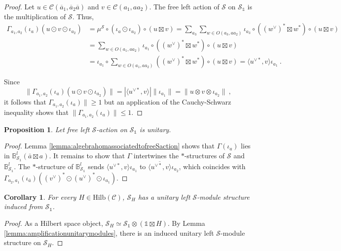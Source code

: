 \documentclass[a4paper,11pt,reqno]{amsart}
\numberwithin{equation}{section}
\newtheorem{corollary}[theorem]{Corollary}
\newtheorem{proposition}[theorem]{Proposition}
\theoremstyle{remark}
\theoremstyle{definition}
\newcommand{\bB}{\mathbb B}
\newcommand{\cC}{\mathcal C}
\newcommand{\cS}{\mathcal S}
\newcommand\un{{\mathds 1}}
\newcommand{\Hilb}{\mathrm{Hilb}}
\begin{document}
\begin{proof}
	Let $u \in \cC(\overline{a}_1, \overline{a}_2 \overline{a})$ and $v \in \cC(a_1, a a_2)$. The free left action of $\cS$ on $\cS_\un$ is the multiplication of $\cS$. Thus, 
	\begin{align*}
		\Gamma_{a_1,a_2}(\iota_a) (u \odot v \odot \iota_{a_2}) & = \mu^\cS \circ (\iota_a \odot \iota_{a_2}) \circ (u \boxtimes v) = \sum_{a_3} \sum_{w \in O(a_3,a a_2)} \iota_{a_3} \circ ( (w^\vee)^* \boxtimes w^*)  \circ (u \boxtimes v) \\
		& = \sum_{w \in O(a_1,a a_2)} \iota_{a_1} \circ ( (w^\vee)^* \boxtimes w^*)  \circ (u \boxtimes v) \\
		& = \iota_{a_1}  \circ \sum_{w \in O(a_1,a a_2)} ( (w^\vee)^* \boxtimes w^*)  \circ (u \boxtimes v)  =  \langle u^{\vee * }, v \rangle \iota_{{a_1}} \ .
	\end{align*}
	
	Since 
	\[
	\| \Gamma_{a_1,a_2}(\iota_a) (u \odot v \odot \iota_{a_2})  \| = | \langle u^{\vee * }, v \rangle| \| \iota_{{a_1}} \| = \| u \otimes v \otimes \iota_{a_2} \| \ ,
	\]
	it follows that $\Gamma_{a_1,a_2} (\iota_a)\| \geq 1$ but an application of the Cauchy-Schwarz inequality shows that $\| \Gamma_{a_1,a_2} (\iota_a)\| \leq 1$.
\end{proof}



\begin{proposition}
	Let free left $\cS$-action on $\cS_\un$ is unitary.
\end{proposition}
\begin{proof}
	Lemma \ref{lemma:algebrahomassociatedtofreeSaction} shows that $\Gamma(\iota_a)$ lies in $\bB_{\cS_\un}^l(\bar{a} \boxtimes a)$. It remains to show that $\Gamma$ intertwines the $*$-structures of $\cS$ and $\bB_{\cS_\un}^l$. The $*$-structure of $\bB^l_{\cS_\un}$ sends $ \langle u^{\vee * }, v \rangle \iota_{{a_1}}$ to $\overline{\langle u^{\vee * }, v \rangle } \iota_{a_2}$, which coincides with $\Gamma_{a_2,a_1}(\iota_{\bar{a}})((v^\vee)^* \odot (u^\vee)^* \odot \iota_{a_1})$.
\end{proof}

\begin{corollary}
	For every $H \in \Hilb(\cC)$, $\cS_H$ has a unitary left $\cS$-module structure induced from $\cS_\un$.
\end{corollary}
\begin{proof}
	As a Hilbert space object, $\cS_H \simeq \cS_\un \otimes (\un \boxtimes H)$. By Lemma \ref{lemma:amplificationunitarymodules}, there is an induced unitary left $\cS$-module structure on $\cS_H$.
\end{proof}
\end{document}
